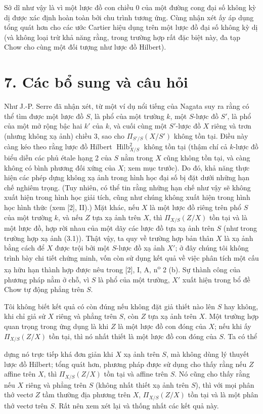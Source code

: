 \documentclass[11pt,twoside,openany]{book}
\numberwithin{equation}{section}
\newcommand{\src}[1]{%
  \phantomsection\hypertarget{src:\fgasourceid:#1}{}%
  \marginpar{\raggedleft\footnotesize\sffamily #1}%
}
\newcommand{\fgasourceid}{unset}
\newcommand{\fsection}[2]{%
  \section*{#1. #2}%
  \addcontentsline{toc}{section}{#1. #2}%
}
\begin{document}
Sở dĩ như vậy là vì một lược đồ con chiều 0 của một đường cong đại số không
kỳ dị được xác định hoàn toàn bởi chu trình tương ứng. Cùng nhận xét ấy áp
dụng tổng quát hơn cho các ước Cartier hiệu dụng trên một lược đồ đại số không
kỳ dị (và không loại trừ khả năng rằng, trong trường hợp rất đặc biệt này, đa
tạp Chow cho cùng một đối tượng như lược đồ Hilbert).

\fsection{7}{Các bổ sung và câu hỏi}

Như J.-P. Serre đã nhận xét, từ một ví dụ nổi tiếng của Nagata suy ra rằng có
thể tìm được một lược đồ $S$, là phổ của một trường $k$, một $S$-lược đồ $S'$,
là phổ của một mở rộng bậc hai $k'$ của $k$, và cuối cùng một $S'$-lược đồ $X$
riêng và trơn (nhưng không xạ ảnh) chiều 3, sao cho $\Pi_{S'/S}(X/S')$ không
tồn tại. Điều này càng kéo theo rằng lược đồ Hilbert
$\operatorname{Hilb}^2_{X/S}$ không tồn tại (thậm chí cả $k$-lược đồ biểu diễn
các phủ étale hạng 2 của $S$ nằm trong $X$ cũng không tồn tại, và càng không có
bình phương đối xứng của $X$; xem mục trước). Do đó, khả năng thực hiện các
phép dựng không xạ ảnh trong hình học đại số bị đặt dưới những hạn chế nghiêm
trọng. (Tuy nhiên, có thể tin rằng những hạn chế như vậy sẽ không xuất hiện
trong hình học giải tích, cũng như chúng không xuất hiện trong hình học hình
thức (xem [2], II).) Mặt khác, nếu $X$ là một lược đồ riêng trên phổ $S$ của
một trường $k$, và nếu $Z$ tựa xạ ảnh trên $X$, thì $\Pi_{X/S}(Z/X)$ tồn tại
và là một lược đồ, hợp rời nhau của một dãy các lược đồ tựa xạ ảnh trên $S$
(như trong trường hợp xạ ảnh (3.1)). Thật vậy, ta quy về trường hợp bản thân
$X$ là xạ ảnh bằng cách để $X$ được trội bởi một $S$-lược đồ xạ ảnh $X'$; ở đây
chúng tôi không trình bày chi tiết chứng minh, vốn còn sử dụng kết quả về việc
phân tích một cấu xạ hữu hạn thành hợp được nêu trong [2], I, A,
n\textsuperscript{o} 2 (b). Sự thành công của phương pháp nằm ở chỗ, vì $S$ là
phổ của một trường, $X'$ xuất hiện trong bổ đề Chow tự động phẳng trên $S$.

Tôi không biết kết quả có còn đúng nếu không đặt giả thiết nào lên $S$ hay
không, khi chỉ giả sử $X$ riêng và phẳng trên $S$, còn $Z$ tựa xạ ảnh trên
$X$. Một trường hợp quan trọng trong ứng dụng là khi $Z$ là một lược đồ con
đóng của $X$; nếu khi ấy $\Pi_{X/S}(Z/X)$ tồn tại, thì nó nhất thiết là một
lược đồ con đóng của $S$. Ta có thể
\src{276}
dựng nó trực tiếp khá đơn giản khi $X$ xạ ảnh trên $S$, mà không dùng lý
thuyết lược đồ Hilbert; tổng quát hơn, phương pháp được sử dụng cho thấy rằng
nếu $Z$ affine trên $X$, thì $\Pi_{X/S}(Z/X)$ tồn tại và affine trên $S$. Nó
cũng cho thấy rằng nếu $X$ riêng và phẳng trên $S$ (không nhất thiết xạ ảnh
trên $S$), thì với mọi phân thớ vectơ $Z$ tầm thường địa phương trên $X$,
$\Pi_{X/S}(Z/X)$ tồn tại và là một phân thớ vectơ trên $S$. Rất nên xem xét
lại và thống nhất các kết quả này.
\end{document}
